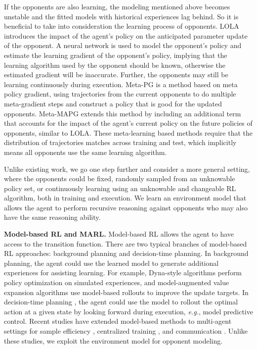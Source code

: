 \documentclass{article}
\begin{document}
If the opponents are also learning, the modeling mentioned above becomes unstable and the fitted models with historical experiences lag behind. So it is beneficial to take into consideration the learning process of opponents. LOLA \citep{foerster2018learning} introduces the impact of the agent's policy on the anticipated parameter update of the opponent. A neural network is used to model the opponent's policy and estimate the learning gradient of the opponent's policy, implying that the learning algorithm used by the opponent should be known, otherwise the estimated gradient will be inaccurate. Further, the opponents may still be learning continuously during execution. Meta-PG \citep{shedivat2017continuous} is a method based on meta policy gradient, using trajectories from the current opponents to do multiple meta-gradient steps and construct a policy that is good for the updated opponents. Meta-MAPG \citep{kim2021policy} extends this method by including an additional term that accounts for the impact of the agent’s current policy on the future policies of opponents, similar to LOLA. These meta-learning based methods require that the distribution of trajectories matches across training and test, which implicitly means all opponents use the same learning algorithm.

Unlike existing work, we go one step further and consider a more general setting, where the opponents could be fixed, randomly sampled from an unknowable policy set, or continuously learning using an unknowable and changeable RL algorithm, both in training and execution. We learn an environment model that allows the agent to perform recursive reasoning against opponents who may also have the same reasoning ability.

\textbf{Model-based RL and MARL.}
Model-based RL allows the agent to have access to the transition function. There are two typical branches of model-based RL approaches: background planning and decision-time planning. 
In background planning, the agent could use the learned model to generate additional experiences for assisting learning. For example, Dyna-style algorithms \citep{sutton1990integrated,kurutach2018model,luo2019algorithmic} perform policy optimization on simulated experiences, and model-augmented value expansion algorithms \citep{feinberg2018model,oh2017value,buckman2018sample} use model-based rollouts to improve the update targets. In decision-time planning \citep{chua2018deep}, the agent could use the model to rollout the optimal action at a given state by looking forward during execution, \emph{e.g.}, model predictive control. %
Recent studies have extended model-based methods to multi-agent settings for sample efficiency \citep{zhang2020model,AORPO}, centralized training \citep{willemsen2021mambpo}, and communication \citep{kim2020communication}. Unlike these studies, we exploit the environment model for opponent modeling.
\end{document}
